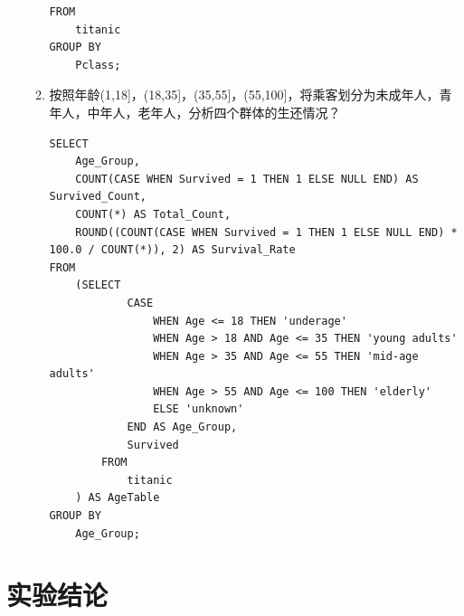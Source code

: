 \documentclass{article}
\begin{document}
\begin{enumerate}
\begin{enumerate}
\begin{lstlisting}[style=sqlstyle]
FROM 
    titanic
GROUP BY 
    Pclass;
        \end{lstlisting}
        \item 按照年龄(1,18]，(18,35]，(35,55]，(55,100]，将乘客划分为未成年人，青年人，中年人，老年人，分析四个群体的生还情况？
        \begin{lstlisting}[style=sqlstyle]
SELECT 
    Age_Group,
    COUNT(CASE WHEN Survived = 1 THEN 1 ELSE NULL END) AS Survived_Count,
    COUNT(*) AS Total_Count,
    ROUND((COUNT(CASE WHEN Survived = 1 THEN 1 ELSE NULL END) * 100.0 / COUNT(*)), 2) AS Survival_Rate
FROM 
    (SELECT 
            CASE
                WHEN Age <= 18 THEN 'underage'
                WHEN Age > 18 AND Age <= 35 THEN 'young adults'
                WHEN Age > 35 AND Age <= 55 THEN 'mid-age adults'
                WHEN Age > 55 AND Age <= 100 THEN 'elderly'
                ELSE 'unknown'
            END AS Age_Group,
            Survived
        FROM 
            titanic
    ) AS AgeTable
GROUP BY 
    Age_Group;
        \end{lstlisting}
    \end{enumerate}
    
\end{enumerate}
\section{实验结论}
\end{document}
